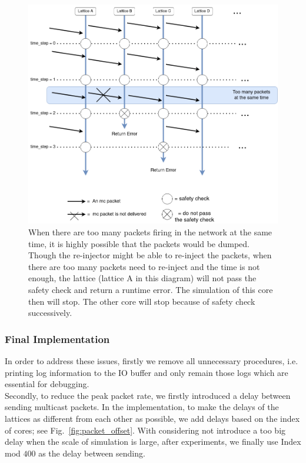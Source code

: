 \begin{figure}[!tb]
   \centering
       \includegraphics[width=1\textwidth]{figures/packet_error.png}
       \caption{When there are too many packets firing in the network at the same time, it is highly possible that the packets would be dumped. Though the re-injector might be able to re-inject the packets, when there are too many packets need to re-inject and the time is not enough, the lattice (lattice A in this diagram) will not pass the safety check and return a runtime error. The simulation of this core then will stop. The other core will stop because of safety check successively.}
       \label{fig:packet_error}
\end{figure}
\subsubsection{Final Implementation}
In order to address these issues, firstly we remove all unnecessary procedures, i.e. printing log information to the IO buffer and only remain those logs which are essential for debugging.\\

Secondly, to reduce the peak packet rate, we firstly introduced a delay between sending multicast packets. In the implementation, to make the delays of the lattices as different from each other as possible, we add delays based on the index of cores; see Fig.~\ref{fig:packet_offset}. With considering not introduce a too big delay when the scale of simulation is large, after experiments, we finally use Index mod $400$ as the delay between sending.\\

